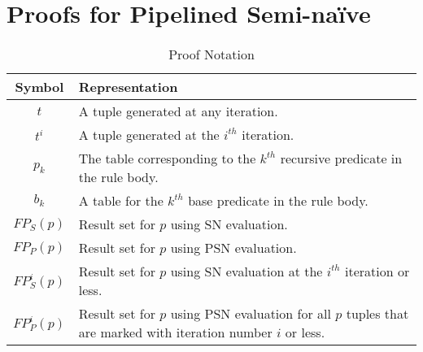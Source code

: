 
\appendix

\section{Proofs for Pipelined Semi-na\"{i}ve}
\label{appendix:pipeline}

{\small 
\begin{table}[ht]
\begin{center}
\begin{tabular}{|c|p{2.5in}|} \hline
\bf{Symbol} & \bf{Representation} \\ \hline
$t$ & A tuple generated at any iteration.\\ \hline
$t^{i}$ & A tuple generated at the $i^{th}$ iteration.\\ \hline
$p_{k}$ & The table corresponding to the $k^{th}$ recursive predicate in the rule body.\\ \hline
$b_{k}$ & A table for the $k^{th}$ base predicate in the rule body.\\ \hline
$FP_{S}(p)$ & Result set for $p$ using SN evaluation.\\ \hline
$FP_{P}(p)$ & Result set for $p$ using PSN evaluation.\\ \hline
$FP_{S}^{i}(p)$ & Result set for $p$ using SN evaluation at the $i^{th}$
iteration or less.\\ \hline
$FP_{P}^{i}(p)$ & Result set for $p$ using PSN evaluation for all $p$
tuples that are marked with iteration number $i$ or less.\\ \hline
\end{tabular}
\caption{Proof Notation\label{table:notation}}
\end{center}
\end{table}
}





